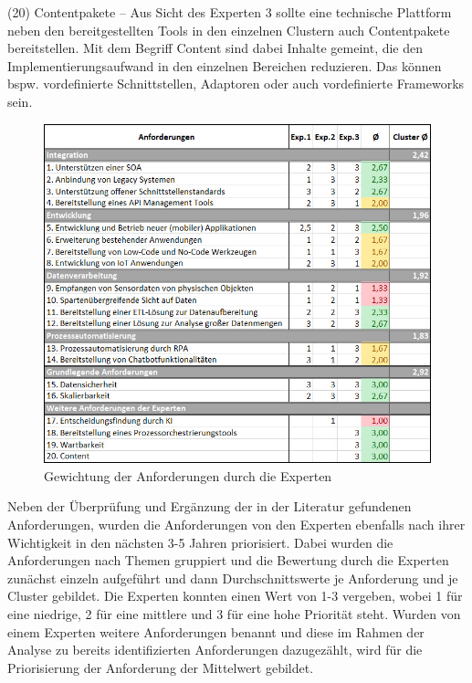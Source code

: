 (20) Contentpakete – Aus Sicht des Experten 3 sollte eine technische Plattform neben den bereitgestellten Tools in den einzelnen Clustern auch Contentpakete bereitstellen. Mit dem Begriff Content sind dabei Inhalte gemeint, die den Implementierungsaufwand in den einzelnen Bereichen reduzieren. Das können bspw. vordefinierte Schnittstellen, Adaptoren oder auch vordefinierte Frameworks sein. \autocite[Vgl.][]{SCHMIDT2023} 

\begin{figure}[h]
    \centering
    \includegraphics[width=1\textwidth]{img/Gewichtung_Anforderung.jpg}
    \caption[Gewichtung der Anforderungen durch die Experten]{Gewichtung der Anforderungen durch die Experten\autocite{Gewichtung}}
    \label{fig:Gewichtung}
\end{figure}

Neben der Überprüfung und Ergänzung der in der Literatur gefundenen Anforderungen, wurden die Anforderungen von den Experten ebenfalls nach ihrer Wichtigkeit in den nächsten 3-5 Jahren priorisiert. Dabei wurden die Anforderungen nach Themen gruppiert und die Bewertung durch die Experten zunächst einzeln aufgeführt und dann Durchschnittswerte je Anforderung und je Cluster gebildet. Die Experten konnten einen Wert von 1-3 vergeben, wobei 1 für eine niedrige, 2 für eine mittlere und 3 für eine hohe Priorität steht. Wurden von einem Experten weitere Anforderungen benannt und diese im Rahmen der Analyse zu bereits identifizierten Anforderungen dazugezählt, wird für die Priorisierung der Anforderung der Mittelwert gebildet.

